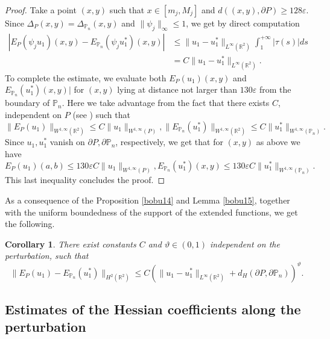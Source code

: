 \documentclass[JEP,XML,SOM,Unicode,ThmDefs,NoFloatCountersInSection,published]{cedram}
\theoremstyle{plain}
\newtheorem{cor}[thm]{Corollary}
\theoremstyle{definition}
\newcommand{\thetathree}{\vartheta}
\let\Bbb\mathbb
\def\R{\mathbb{R}}
\newcommand{\vps}{\varepsilon}
\begin{document}
\begin{proof}
Take a point $(x,y)$ such that $x \in [m_j, M_j]$ and $d((x,y), \partial P) \ge 128 \vps$. Since $\Delta_P(x,y) =\Delta_{\Bbb P_n}(x,y)$ and $\|\psi_j\|_\infty \le 1$, we get by direct computation
\begin{align*}
|E_P(\psi_j u_1)(x,y)-E_{\Bbb P_n}(\psi_j u^*_1)(x,y)|&\le \|u_1-u_1^*\|_{L^\infty(\R^2)}\int_1^{+\infty}|\tau(s) | ds \\
&= C \|u_1-u_1^*\|_{L^\infty(\R^2)}.
\end{align*}
To complete the estimate, we evaluate both $E_P(u_1)(x,y)$ and $E_{\Bbb P_n}(u^*_1)(x,y)|$ for $(x,y)$ lying at distance not larger than $130 \vps$ from the boundary of $\Bbb P_n$. Here we take advantage from the fact that there exists $C$, independent on $P$ (see \cite[Th.\,5, p.\,181]{St70}) such that
\[
\|E_P(u_1)\|_{W^{1, \infty} (\R^2)} \le C \|u_1\|_{W^{1, \infty} (P)}, \|E_ {\Bbb P_n}(u_1^*)\|_{W^{1, \infty} (\R^2)} \le C \|u_1^*\|_{W^{1, \infty} (\Bbb P_n)}.
\]
Since $u_1, u_1^*$ vanish on $\partial P, \partial \mathbb P_n$, respectively, we get that for $(x,y)$ as above we have
\[
E_P(u_1)(a,b) \le 130 \vps C \|u_1\|_{W^{1, \infty} (P)}, E_ {\Bbb P_n}(u_1^*)(x,y) \le 130 \vps C \|u_1^*\|_{W^{1, \infty} (\Bbb P_n)}.
\]
This last inequality concludes the proof.
\end{proof}
As a consequence of the Proposition \ref{bobu14} and Lemma \ref{bobu15}, together with the uniform boundedness of the support of the extended functions, we get the following.
\begin{cor}
There exist constants $C$ and $\thetathree \in (0, 1)$ independent on the perturbation, such that
\[
\|E_P(u_1)-E_{\Bbb P_n}(u_1^*)\|_{H^{2} (\R^2)}\le C (\|u_1-u_1^*\|_{L^\infty(\R^2)}+d_H(\partial P, \partial \Bbb P_n))^\thetathree.
\]
\end{cor}

\subsection{Estimates of the Hessian coefficients along the perturbation}
\end{document}
